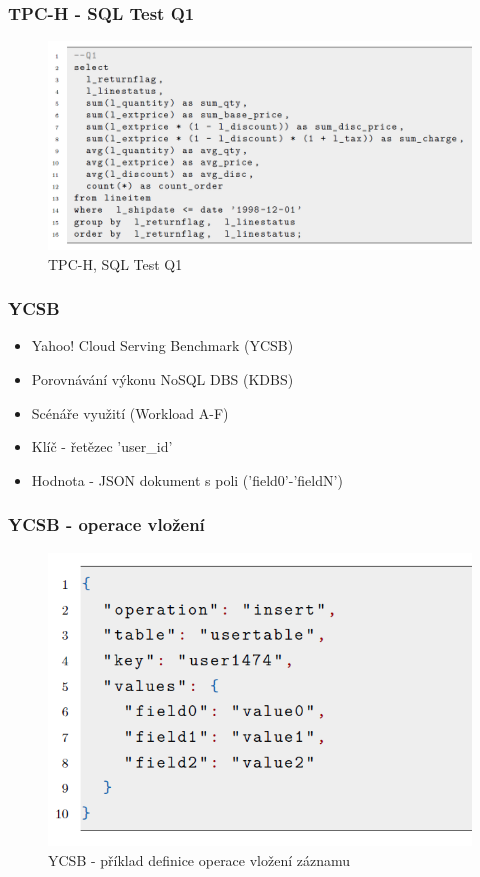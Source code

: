 \documentclass{beamer}
\begin{document}
	\begin{frame}
		\frametitle{TPC-H - SQL Test Q1}
		\begin{figure}
			\centering
			\includegraphics[scale=0.4]{Figures/tpc_test.PNG}
			\caption{TPC-H, SQL Test Q1~\cite{tpc-h-sql, tpc-h-index}}
		\end{figure}
	\end{frame}
	
	\begin{frame}
		\frametitle{YCSB}
		\begin{itemize}
			\item Yahoo! Cloud Serving Benchmark (YCSB)~\cite{ycsb}
			\item Porovnávání výkonu NoSQL DBS (KDBS)
			\item Scénáře využití (Workload A-F)
			\item Klíč - řetězec 'user\_id'
			\item Hodnota - JSON dokument s poli ('field0'-'fieldN')
		\end{itemize}
	\end{frame}
	
	\begin{frame}
		\frametitle{YCSB - operace vložení}
		\begin{figure}
			\centering
			\includegraphics[scale=0.53]{Figures/ycsb_insert.PNG}
			\caption{YCSB - příklad definice operace vložení záznamu}
		\end{figure}
	\end{frame}
	
\end{document}
